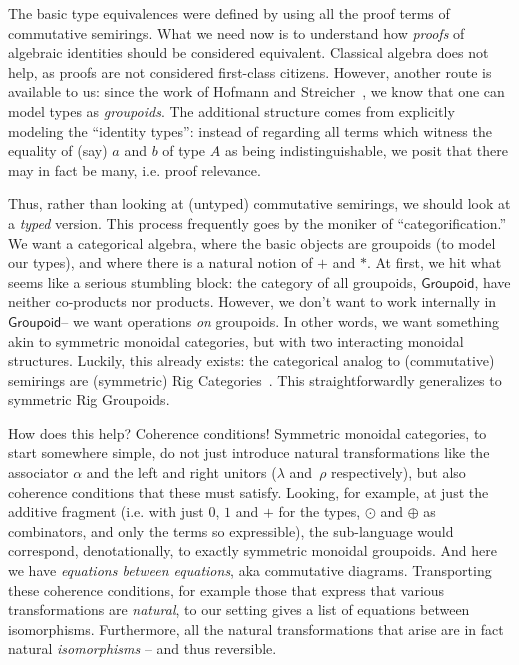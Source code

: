 \documentclass[sigplan,review,anonymous]{acmart}
\newcommand{\Gpd}{\ensuremath{\mathsf{Groupoid}}}
\begin{document}
The basic type equivalences were defined by using all the
proof terms of commutative semirings. What we need
now is to understand how \emph{proofs} of algebraic identities should be
considered equivalent. Classical algebra does not help, as proofs
are not considered first-class citizens. However,
another route is available to us: since the work of
Hofmann and Streicher~\cite{hofmann96thegroupoid}, we know that
one can model types as \emph{groupoids}.  The additional
structure comes from explicitly modeling the ``identity
types'': instead of regarding all terms which witness
the equality of (say) $a$ and $b$ of type $A$ as being
indistinguishable, we posit that there may in fact be many,
i.e. proof relevance.

Thus, rather than looking at (untyped) commutative semirings, we
should look at a \emph{typed} version. This process frequently goes by
the moniker of ``categorification.''  We want a categorical algebra,
where the basic objects are groupoids (to model our types), and where
there is a natural notion of $+$ and $*$.  At first, we hit what seems
like a serious stumbling block: the category of all groupoids, \Gpd,
have neither co-products nor products. However, we don't want to work
internally in \Gpd -- we want operations \emph{on} groupoids. In other
words, we want something akin to symmetric monoidal categories, but
with two interacting monoidal structures.  Luckily, this already
exists: the categorical analog to (commutative) semirings are
(symmetric) Rig Categories~\cite{laplaza72,kelly74}.  This
straightforwardly generalizes to symmetric Rig Groupoids.

How does this help? Coherence conditions! Symmetric monoidal categories,
to start somewhere simple, do not just introduce natural transformations
like the associator $\alpha$ and the left and right unitors ($\lambda$
and~$\rho$ respectively), but also coherence conditions that these must satisfy.
Looking, for example, at just the additive fragment (i.e. with just $0$,
$1$ and $+$ for the types, $\odot$ and $\oplus$ as combinators, and
only the terms so expressible), the sub-language would correspond,
denotationally, to exactly symmetric monoidal groupoids. And
here we have \emph{equations between equations}, aka
commutative diagrams.  Transporting these coherence conditions, for
example those that express that various transformations are \emph{natural},
to our setting gives a list of equations between isomorphisms.
Furthermore, all the natural transformations
that arise are in fact natural \emph{isomorphisms} -- and thus
reversible.
\end{document}
